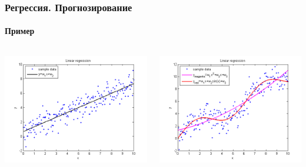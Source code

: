 \documentclass[xcolor=table]{beamer}
\begin{document}
\begin{frame}
  \frametitle{Регрессия. Прогнозирование}
  \framesubtitle{Пример}

  \begin{columns}
    \begin{column}{0.5\textwidth}
      \begin{center}
        {\includegraphics[scale=0.33,clip=true,trim=13mm 3mm 16mm 4mm]{data/regr1.png}}
      \end{center}
    \end{column}
    
    \begin{column}{0.5\textwidth}
      \begin{center}
        {\includegraphics[scale=0.33,clip=true,trim=13mm 3mm 16mm 4mm]{data/regr2.png}}
      \end{center}
    \end{column}
    
  \end{columns}
\end{frame}
\end{document}
